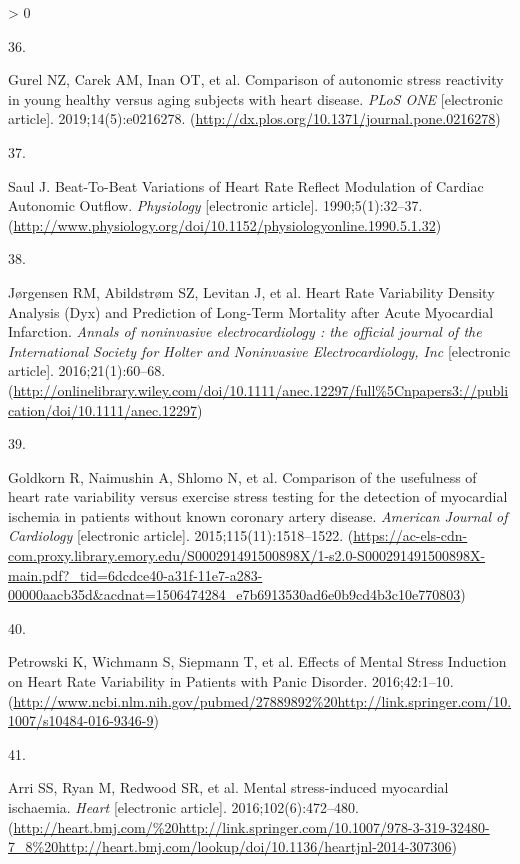 \documentclass[
  11pt,
  openany]{book}
\newlength{\cslhangindent}
\newlength{\csllabelwidth}
\newenvironment{CSLReferences}[2] %
 {%
  \setlength{\parindent}{0pt}
  \ifodd #1 \everypar{\setlength{\hangindent}{\cslhangindent}}\ignorespaces\fi
  \ifnum #2 > 0
  \setlength{\parskip}{#2\baselineskip}
  \fi
 }%
 {}
\newcommand{\CSLLeftMargin}[1]{\parbox[t]{\csllabelwidth}{#1}}
\newcommand{\CSLRightInline}[1]{\parbox[t]{\linewidth - \csllabelwidth}{#1}\break}
\begin{document}
\begin{CSLReferences}{0}{0}
\leavevmode\hypertarget{ref-Gurel2019a}{}%
\CSLLeftMargin{36. }
\CSLRightInline{Gurel NZ, Carek AM, Inan OT, et al. {Comparison of autonomic stress reactivity in young healthy versus aging subjects with heart disease}. \emph{PLoS ONE} {[}electronic article{]}. 2019;14(5):e0216278. (\url{http://dx.plos.org/10.1371/journal.pone.0216278})}

\leavevmode\hypertarget{ref-Saul1990}{}%
\CSLLeftMargin{37. }
\CSLRightInline{Saul J. {Beat-To-Beat Variations of Heart Rate Reflect Modulation of Cardiac Autonomic Outflow}. \emph{Physiology} {[}electronic article{]}. 1990;5(1):32--37. (\url{http://www.physiology.org/doi/10.1152/physiologyonline.1990.5.1.32})}

\leavevmode\hypertarget{ref-Juxf8rgensen2016}{}%
\CSLLeftMargin{38. }
\CSLRightInline{Jørgensen RM, Abildstrøm SZ, Levitan J, et al. {Heart Rate Variability Density Analysis (Dyx) and Prediction of Long-Term Mortality after Acute Myocardial Infarction.} \emph{Annals of noninvasive electrocardiology : the official journal of the International Society for Holter and Noninvasive Electrocardiology, Inc} {[}electronic article{]}. 2016;21(1):60--68. (\url{http://onlinelibrary.wiley.com/doi/10.1111/anec.12297/full\%5Cnpapers3://publication/doi/10.1111/anec.12297})}

\leavevmode\hypertarget{ref-Goldkorn2015b}{}%
\CSLLeftMargin{39. }
\CSLRightInline{Goldkorn R, Naimushin A, Shlomo N, et al. {Comparison of the usefulness of heart rate variability versus exercise stress testing for the detection of myocardial ischemia in patients without known coronary artery disease}. \emph{American Journal of Cardiology} {[}electronic article{]}. 2015;115(11):1518--1522. (\url{https://ac-els-cdn-com.proxy.library.emory.edu/S000291491500898X/1-s2.0-S000291491500898X-main.pdf?_tid=6dcdce40-a31f-11e7-a283-00000aacb35d\&acdnat=1506474284_e7b6913530ad6e0b9cd4b3c10e770803})}

\leavevmode\hypertarget{ref-Petrowski2016}{}%
\CSLLeftMargin{40. }
\CSLRightInline{Petrowski K, Wichmann S, Siepmann T, et al. {Effects of Mental Stress Induction on Heart Rate Variability in Patients with Panic Disorder}. 2016;42:1--10. (\url{http://www.ncbi.nlm.nih.gov/pubmed/27889892\%20http://link.springer.com/10.1007/s10484-016-9346-9})}

\leavevmode\hypertarget{ref-Arri2016}{}%
\CSLLeftMargin{41. }
\CSLRightInline{Arri SS, Ryan M, Redwood SR, et al. {Mental stress-induced myocardial ischaemia}. \emph{Heart} {[}electronic article{]}. 2016;102(6):472--480. (\url{http://heart.bmj.com/\%20http://link.springer.com/10.1007/978-3-319-32480-7_8\%20http://heart.bmj.com/lookup/doi/10.1136/heartjnl-2014-307306})}


\end{CSLReferences}
\end{document}
